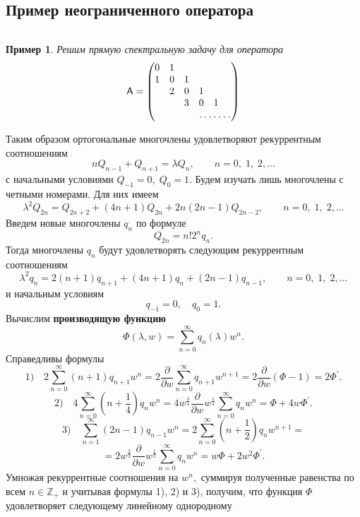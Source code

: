\documentclass[12 pt, a4 paper]{article}
\theoremstyle{plain}   \newtheorem{Pro}{Задача}
\newtheorem{Exa}{Пример}
\begin{document}
\subsection{Пример неограниченного оператора}
$ \; $
\\
\begin{Exa}
Решим прямую спектральную задачу для оператора
\begin{equation*}
  \mathsf{A}=
    \begin{pmatrix}
	  0 & 1 & \; & \; & \;& \;  \\
	  1 & 0 & 1 & \; & \; & \; \\
	  \; & 2 & 0 & 1 & \; & \; \\
	  \; & \; & 3 & 0 & 1 & \; \\
	  \; & \; & \; & \hdotsfor{3}
	\end{pmatrix}
\end{equation*}
\end{Exa}
Таким образом ортогональные многочлены удовлетворяют
рекуррентным соотношениям
$$
  nQ_{n-1}+Q_{n+1}=\lambda Q_n ,
  \qquad n=0, \; 1, \; 2,...
$$
с начальными условиями
$ Q_{-1}=0, \; Q_0 =1. $
Будем изучать лишь многочлены с четными номерами. Для них имеем
$$
  \lambda ^2 Q_{2n}=Q_{2n+2}+(4n+1)Q_{2n}+2n(2n-1)Q_{2n-2},
  \qquad n=0, \; 1, \; 2,...
$$
Введем новые многочлены
$ q_n $
по формуле
$$
  Q_{2n}=n!2^n q_n .
$$
Тогда многочлены
$ q_n $
будут удовлетворять следующим рекуррентным соотношениям
$$
  \lambda ^2 q_n =2(n+1)q_{n+1}+(4n+1)q_n +(2n-1)q_{n-1},
  \qquad n=0, \; 1, \; 2,...
$$
и начальным условиям
$$
  q_{-1}=0, \quad q_0 =1.
$$
Вычислим
{\bfseries производящую функцию}
$$
  \Phi (\lambda , w)=\sum _{n=0}^{\infty}
  q_n (\lambda )w^n .
$$
Справедливы формулы
$$
  1) \quad 2\sum _{n=0}^{\infty} (n+1)q_{n+1}w^n =
  2 \frac{\partial}{\partial w} \sum _{n=0}^{\infty}
  q_{n+1}w^{n+1}=2\frac{\partial}{\partial w}
  (\Phi -1)=2\Phi ^{\prime}.
$$
$$
  2) \quad 4\sum _{n=0}^{\infty}(n+\frac{1}{4})q_n w^n =
  4w^{\frac{3}{4}}\frac{\partial}{\partial w}
  w^{\frac{1}{4}}\sum _{n=0}^{\infty}q_n w^n =
  \Phi +4w\Phi ^{\prime}.
$$
$$
  3) \quad \sum _{n=1}^{\infty}(2n-1)q_{n-1}w^n =
  2\sum _{n=0}^{\infty}(n+\frac{1}{2})q_n w^{n+1}=
$$
$$
  =2w^{\frac{3}{2}} \frac{\partial}{\partial w}
  w^{\frac{1}{2}} \sum _{n=0}^{\infty}q_n w^n =
  w\Phi +2w^2 \Phi ^{\prime}.
$$
Умножая рекуррентные соотношения на
$ w^n , $
суммируя полученные равенства по всем
$ n \in \mathbb{Z}_+ $
и учитывая формулы 1), 2) и 3), получим, что функция
$ \Phi $
удовлетворяет следующему линейному однородному
\end{document}
